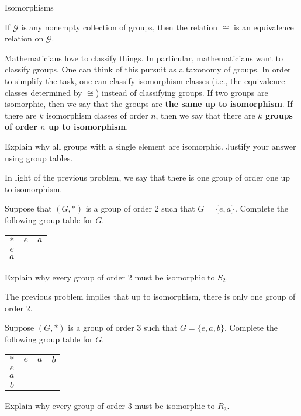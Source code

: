 \begin{section}{Isomorphisms}
\begin{theorem}
If $\mathcal{G}$ is any nonempty collection of groups, then the relation $\cong$ is an equivalence relation on $\mathcal{G}$.
\end{theorem}

Mathematicians love to classify things.  In particular, mathematicians want to classify groups.  One can think of this pursuit as a taxonomy of groups. In order to simplify the task, one can classify isomorphism classes (i.e., the equivalence classes determined by $\cong$) instead of classifying groups.  If two groups are isomorphic, then we say that the groups are \textbf{the same up to isomorphism}.  If there are $k$ isomorphism classes of order $n$, then we say that there are \textbf{$k$ groups of order $n$ up to isomorphism}.

\begin{problem}
Explain why all groups with a single element are isomorphic.  Justify your answer using group tables.
\end{problem}

In light of the previous problem, we say that there is one group of order one up to isomorphism.

\begin{problem}
Suppose that $(G,*)$ is a group of order 2 such that $G=\{e,a\}$.  Complete the following group table for $G$.
\begin{center}
\begin{tabular}{c!{\vrule width 2pt}c|c}
$*$ & $e$ & $a$ \\ 
$e$ &  &  \\
\hline $a$ &  & 
\end{tabular}
\end{center}
Explain why every group of order 2 must be isomorphic to $S_2$. 
\end{problem}

The previous problem implies that up to isomorphism, there is only one group of order 2.

\begin{problem}
Suppose $(G,*)$ is a group of order 3 such that $G=\{e,a,b\}$.  Complete the following group table for $G$.
\begin{center}
\begin{tabular}{c!{\vrule width 2pt}c|c|c}
$*$ & $e$ & $a$ & $b$ \\ 
$e$ &  &  & \\
\hline $a$ &  & & \\
\hline $b$ &  & &
\end{tabular}
\end{center}
Explain why every group of order 3 must be isomorphic to $R_3$.
\end{problem}


\end{section}
